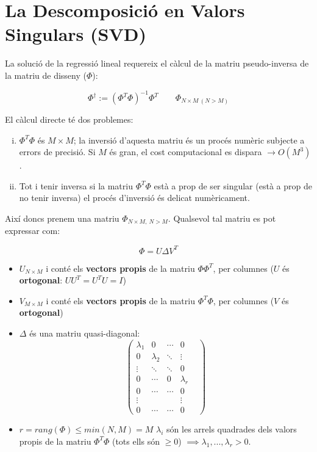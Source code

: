 \documentclass[a4paper]{article}
\begin{document}
\section{La Descomposició en Valors Singulars (SVD)}

La solució de la regressió lineal requereix el càlcul de la matriu pseudo-inversa de la matriu de disseny ($\Phi$):

$$ \Phi^{\dag} := ( \Phi^T \Phi)^{-1} \Phi^T \qquad \Phi_{N \times M \ (N > M)} $$

El càlcul directe té dos problemes:
\begin{enumerate}[i)]
	\item $\Phi^T \Phi$ és $M \times M$; la inversió d'aquesta matriu és un procés numèric subjecte a errors de precisió. Si $M$ és gran, el cost computacional es dispara $\rightarrow O(M^3)$.
	\item Tot i tenir inversa si la matriu $\Phi^T \Phi$ està a prop de ser singular (està a prop de no tenir inversa) el procés d'inversió és delicat numèricament.
\end{enumerate}

Així doncs prenem una matriu $\Phi_{N \times M, \ N > M}$. Qualsevol tal matriu es pot expressar com:

$$
\Phi = U \Delta V^T
$$

\begin{itemize}
	\item $U_{N \times M}$ i conté els \textbf{vectors propis} de la matriu $\Phi \Phi^T$, per columnes ($U$ és \textbf{ortogonal}: $U U^T = U^T U = I$)
	\item $V_{M \times M}$ i conté els \textbf{vectors propis} de la matriu $\Phi^T \Phi$, per columnes ($V$ és \textbf{ortogonal})
	\item $\Delta$ és una matriu quasi-diagonal:
	$$
	\begin{pmatrix}
	\lambda_1 & 0 & \cdots &  0 \\
	0 & \lambda_2 & \ddots &  \vdots \\
	\vdots & \ddots & \ddots & 0 & \\
	0 & \cdots & 0 &\lambda_r \\
	0 & \cdots & \cdots & 0 \\
	\vdots & & & \vdots \\
	0 & \cdots & \cdots & 0
	\end{pmatrix}
	$$
	
	\item  $r = rang(\Phi) \le min(N,M) = M$ $\lambda_i$ són les arrels quadrades dels valors propis de la matriu $\Phi^T \Phi$ (tots ells són $\ge 0$) $\implies \lambda_1, ...,\lambda_r > 0$.
\end{itemize}
\end{document}
